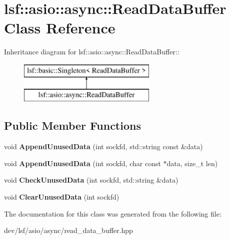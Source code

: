 \hypertarget{classlsf_1_1asio_1_1async_1_1ReadDataBuffer}{
\section{lsf::asio::async::ReadDataBuffer Class Reference}
\label{classlsf_1_1asio_1_1async_1_1ReadDataBuffer}
}
Inheritance diagram for lsf::asio::async::ReadDataBuffer::\begin{figure}[H]
\begin{center}
\leavevmode
\includegraphics[height=2cm]{classlsf_1_1asio_1_1async_1_1ReadDataBuffer}
\end{center}
\end{figure}
\subsection*{Public Member Functions}
\begin{DoxyCompactItemize}
\item 
\hypertarget{classlsf_1_1asio_1_1async_1_1ReadDataBuffer_a8edcebbc2fff23e6ce7c9f3c10eba496}{
void {\bfseries AppendUnusedData} (int sockfd, std::string const \&data)}
\label{classlsf_1_1asio_1_1async_1_1ReadDataBuffer_a8edcebbc2fff23e6ce7c9f3c10eba496}

\item 
\hypertarget{classlsf_1_1asio_1_1async_1_1ReadDataBuffer_a5710e34b904b4891e67e1c770d4f6c3c}{
void {\bfseries AppendUnusedData} (int sockfd, char const $\ast$data, size\_\-t len)}
\label{classlsf_1_1asio_1_1async_1_1ReadDataBuffer_a5710e34b904b4891e67e1c770d4f6c3c}

\item 
\hypertarget{classlsf_1_1asio_1_1async_1_1ReadDataBuffer_ae1b47957b9b6c1e97e73a0d3cff9e5e7}{
void {\bfseries CheckUnusedData} (int sockfd, std::string \&data)}
\label{classlsf_1_1asio_1_1async_1_1ReadDataBuffer_ae1b47957b9b6c1e97e73a0d3cff9e5e7}

\item 
\hypertarget{classlsf_1_1asio_1_1async_1_1ReadDataBuffer_a0d2c20b21912fb06e7a206c5e54a2e76}{
void {\bfseries ClearUnusedData} (int sockfd)}
\label{classlsf_1_1asio_1_1async_1_1ReadDataBuffer_a0d2c20b21912fb06e7a206c5e54a2e76}

\end{DoxyCompactItemize}


The documentation for this class was generated from the following file:\begin{DoxyCompactItemize}
\item 
dev/lsf/asio/async/read\_\-data\_\-buffer.hpp\end{DoxyCompactItemize}
